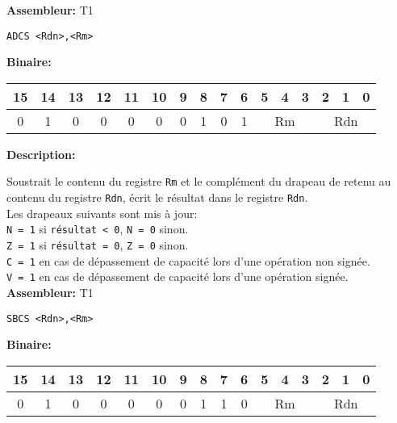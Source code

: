 \documentclass{article}
\begin{document}
    \textbf{Assembleur:} T1

    \begin{lstlisting}
ADCS <Rdn>,<Rm>
    \end{lstlisting}

    \textbf{Binaire:}

    \begin{tabular}{| c c c c c c c c c c c c c c c c |}
        \hline
        15 & 14 & 13 & 12 & 11 & 10 & \multicolumn{1}{|c}{9} & 8 & 7 & 6 & \multicolumn{1}{|c}{5} & 4 & 3 & \multicolumn{1}{|c}{2} & 1 & 0 \\
        \hline
        0 & 1 & 0 & 0 & 0 & 0 & \multicolumn{1}{|c}{0} & 1 & 0 & 1 & \multicolumn{3}{|c}{Rm} & \multicolumn{3}{|c|}{Rdn} \\
        \hline
    \end{tabular}

    \label{subsubsubsec:SBC}

    \textbf{Description: }

    Soustrait le contenu du registre \texttt{Rm} et le complément du drapeau de retenu au contenu du registre \texttt{Rdn}, écrit le résultat dans le registre \texttt{Rdn}.\\
    Les drapeaux suivants sont mis à jour:\\
    \texttt{N = 1} si \texttt{résultat < 0}, \texttt{N = 0} sinon.\\
    \texttt{Z = 1} si \texttt{résultat = 0}, \texttt{Z = 0} sinon.\\
    \texttt{C = 1} en cas de dépassement de capacité lors d'une opération non signée.\\
    \texttt{V = 1} en cas de dépassement de capacité lors d'une opération signée.\\

    \textbf{Assembleur:} T1

    \begin{lstlisting}
SBCS <Rdn>,<Rm>
    \end{lstlisting}

    \textbf{Binaire:}

    \begin{tabular}{| c c c c c c c c c c c c c c c c |}
        \hline
        15 & 14 & 13 & 12 & 11 & 10 & \multicolumn{1}{|c}{9} & 8 & 7 & 6 & \multicolumn{1}{|c}{5} & 4 & 3 & \multicolumn{1}{|c}{2} & 1 & 0 \\
        \hline
        0 & 1 & 0 & 0 & 0 & 0 & \multicolumn{1}{|c}{0} & 1 & 1 & 0 & \multicolumn{3}{|c}{Rm} & \multicolumn{3}{|c|}{Rdn} \\
        \hline
    \end{tabular}
\end{document}
